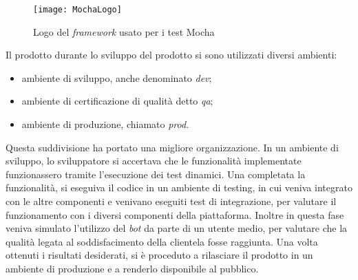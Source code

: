 \begin{figure}[H]
  \centering
  \texttt{[image: MochaLogo]}
  \caption{Logo del \textit{framework} usato per i test Mocha}
\end{figure}

Il prodotto durante lo sviluppo del prodotto si sono utilizzati diversi
ambienti:
\begin{itemize}
  \item ambiente di sviluppo, anche denominato \textit{dev};
  \item ambiente di certificazione di qualità detto \textit{qa};
  \item ambiente di produzione, chiamato \textit{prod}.
\end{itemize}
Questa suddivisione ha portato una migliore organizzazione. In un ambiente di
sviluppo, lo sviluppatore si accertava che le funzionalità implementate
funzionassero tramite l'esecuzione dei test dinamici.
Una completata la funzionalità, si eseguiva il codice in un ambiente di
testing, in cui veniva integrato con le altre componenti e venivano eseguiti
test di integrazione, per valutare il funzionamento con i diversi componenti
della piattaforma. Inoltre in questa fase veniva simulato l'utilizzo del
\textit{bot} da parte di un utente medio, per valutare che la qualità legata al
soddisfacimento della clientela fosse raggiunta.
Una volta ottenuti i risultati desiderati, si è proceduto a rilasciare il
prodotto in un ambiente di produzione e a renderlo disponibile al pubblico.

